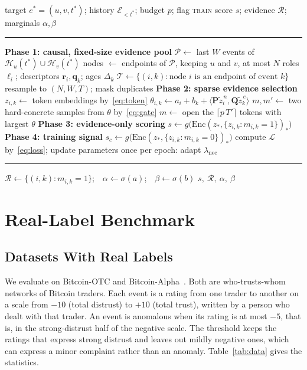 \documentclass[pdflatex,sn-basic]{sn-jnl}
\newcommand{\evident}{\textsc{Evident}}
\newcommand{\Ecal}{\mathcal{E}}
\newcommand{\Hcal}{\mathcal{H}}
\newcommand{\Lcal}{\mathcal{L}}
\newcommand{\Pcal}{\mathcal{P}}
\newcommand{\Rcal}{\mathcal{R}}
\newcommand{\Tcal}{\mathcal{T}}
\theoremstyle{definition}
\theoremstyle{plain}
\begin{document}
\begin{algorithm}[!t]
\caption{\evident{}: score and explain one event}
\label{alg:evident}
\begin{algorithmic}[1]
\Require target $e^\ast=(u,v,t^\ast)$; history $\Ecal_{<t^\ast}$; budget $p$;
flag \textsc{train}
\Ensure score $s$; evidence $\Rcal$; marginals $\alpha,\beta$
\Statex \rule{\linewidth}{0.4pt}
\Statex \textbf{Phase 1: causal, fixed-size evidence pool}
\State $\Pcal\gets$ last $W$ events of $\Hcal_u(t^\ast)\cup\Hcal_v(t^\ast)$
\State nodes $\gets$ endpoints of $\Pcal$, keeping $u$ and $v$, at most $N$
\State roles $\ell_i$; descriptors $\mathbf{r}_i,\mathbf{q}_k$; ages $\Delta_k$
\State $\Tcal\gets\{(i,k):\text{node } i \text{ is an endpoint of event } k\}$
\State resample to $(N,W,T)$; mask duplicates 
\Statex \textbf{Phase 2: sparse evidence selection}
\State $z_{i,k}\gets$ token embeddings by~\eqref{eq:token}
\State $\theta_{i,k}\gets a_i+b_k+\langle\mathbf{P}\tilde{z}^{\,n}_i,
       \mathbf{Q}\tilde{z}^{\,e}_k\rangle$ 
  \State $m,m'\gets$ two hard-concrete samples from $\theta$ by~\eqref{eq:gate}
\Else
  \State $m\gets$ open the $\lceil p\,T'\rceil$ tokens with largest $\theta$
\EndIf
\Statex \textbf{Phase 3: evidence-only scoring}
\State $s\gets g\big(\mathrm{Enc}(z_\ast,\{z_{i,k}:m_{i,k}=1\})_\ast\big)$
\Statex \textbf{Phase 4: training signal} 
  \State $s_c\gets g\big(\mathrm{Enc}(z_\ast,\{z_{i,k}:m_{i,k}=0\})_\ast\big)$
  \State compute $\Lcal$ by~\eqref{eq:loss}; update parameters
  \State once per epoch: adapt $\lambda_{\text{nec}}$
\EndIf
\Statex \rule{\linewidth}{0.4pt}
\State $\Rcal\gets\{(i,k):m_{i,k}=1\}$;\ \ $\alpha\gets\sigma(a)$;\ \
       $\beta\gets\sigma(b)$
\State \Return $s,\ \Rcal,\ \alpha,\ \beta$ 
\end{algorithmic}
\end{algorithm}

\section{Real-Label Benchmark}
\label{sec:bench}

\subsection{Datasets With Real Labels}
We evaluate on Bitcoin-OTC and Bitcoin-Alpha~\cite{bitcoin1,bitcoin2}. Both
are who-trusts-whom networks of Bitcoin traders. Each event is a rating from
one trader to another on a scale from $-10$ (total distrust) to $+10$ (total
trust), written by a person who dealt with that trader. An event is
anomalous when its rating is at most $-5$, that is, in the strong-distrust
half of the negative scale. The threshold keeps the ratings that express
strong distrust and leaves out mildly negative ones, which can express a
minor complaint rather than an anomaly. Table~\ref{tab:data} gives
the statistics.
\end{document}
